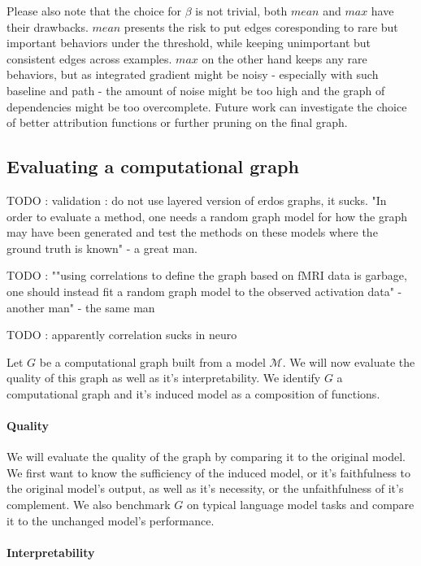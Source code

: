 \documentclass{article}
\begin{document}
Please also note that the choice for $\beta$ is not trivial, both $mean$ and $max$ have their drawbacks. $mean$ presents the risk to put edges coresponding to rare but important behaviors under the threshold, while keeping unimportant but consistent edges across examples. $max$ on the other hand keeps any rare behaviors, but as integrated gradient might be noisy - especially with such baseline and path - the amount of noise might be too high and the graph of dependencies might be too overcomplete. Future work can investigate the choice of better attribution functions or further pruning on the final graph.%

\subsection{Evaluating a computational graph}

TODO : validation : do not use layered version of erdos graphs, it sucks. "In order to evaluate a method, one needs a random graph model for how the graph may have been generated and test the methods on these models where the ground truth is known" - a great man.

TODO : ""using correlations to define the graph based on fMRI data is garbage, one should instead fit a random graph model to the observed activation data" - another man" - the same man

TODO : apparently correlation sucks in neuro

Let $G$ be a computational graph built from a model $\mathcal{M}$. We will now evaluate the quality of this graph as well as it's interpretability. We identify $G$ a computational graph and it's induced model as a composition of functions.

\paragraph{Quality} We will evaluate the quality of the graph by comparing it to the original model. We first want to know the sufficiency of the induced model, or it's faithfulness to the original model's output, as well as it's necessity, or the unfaithfulness of it's complement. We also benchmark $G$ on typical language model tasks and compare it to the unchanged model's performance.

\paragraph{Interpretability}
\end{document}
